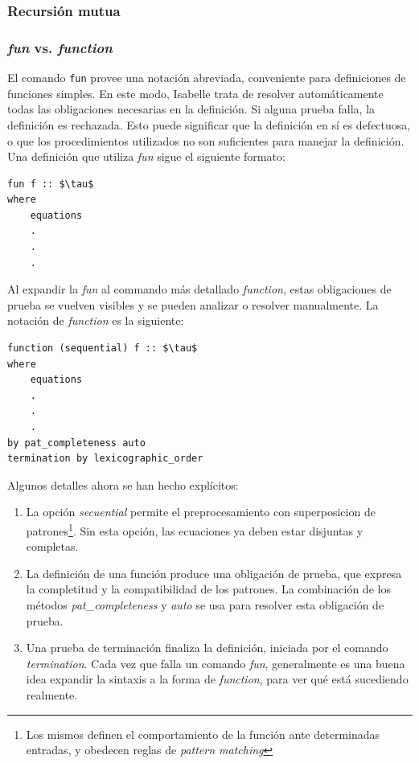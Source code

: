 \documentclass[12pt]{book}
\begin{document}
\subsubsection{Recursión mutua}\label{sssec:recursion_mutua}



\subsubsection{\textit{fun} vs. \textit{function}}

El comando \texttt{fun} provee una notación abreviada, conveniente para definiciones de funciones simples. En este modo, Isabelle trata de resolver automáticamente todas las obligaciones necesarias en la definición. Si alguna prueba falla, la definición es rechazada. Esto puede significar que la definición en sí es defectuosa, o que los procedimientos utilizados no son suficientes para manejar la definición. Una definición que utiliza \textit{fun} sigue el siguiente formato:

\begin{lstlisting}[style=Isabelle, caption=Definición de una función mediante \textit{fun}]
fun f :: $\tau$
where
    equations
    .
    .
    .
\end{lstlisting}

Al expandir la \textit{fun} al commando más detallado \textit{function}, estas obligaciones de prueba se vuelven visibles y se pueden analizar o resolver manualmente. La notación de \textit{function} es la siguiente:

\begin{lstlisting}[style=Isabelle]
function (sequential) f :: $\tau$
where
    equations
    .
    .
    .
by pat_completeness auto
termination by lexicographic_order
\end{lstlisting}

Algunos detalles ahora se han hecho explícitos:
\begin{enumerate}
    \item La opción \textit{secuential} permite el preprocesamiento con superposicion de patrones\footnote{Los mismos definen el comportamiento de la función ante determinadas entradas, y obedecen reglas de \textit{pattern matching}}. Sin esta opción, las ecuaciones ya deben estar disjuntas y completas.
    \item La definición de una función produce una obligación de prueba, que expresa la completitud y la compatibilidad de los patrones. La combinación de los métodos \textit{pat\_completeness} y \textit{auto} se usa para resolver esta obligación de prueba.
    \item Una prueba de terminación finaliza la definición, iniciada por el comando \textit{termination}. Cada vez que falla un comando \textit{fun}, generalmente es una buena idea expandir la sintaxis a la forma de \textit{function}, para ver qué está sucediendo realmente.
\end{enumerate}
\end{document}
